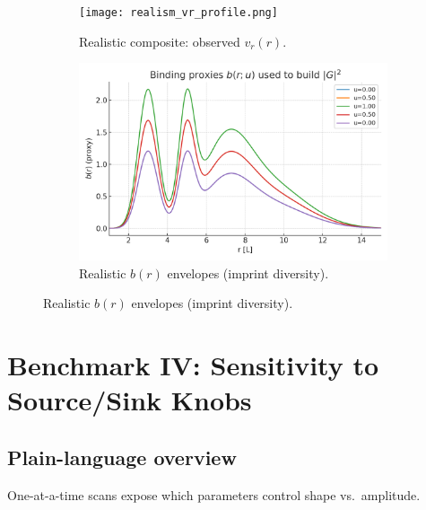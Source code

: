 \documentclass[12pt,a4paper,oneside]{scrreprt}
\begin{document}
\begin{figure}[htbp]\centering
  \begin{subfigure}[t]{0.49\linewidth}
    \texttt{[image: realism\_vr\_profile.png]}
    \caption{Realistic composite: observed $v_r(r)$.}
    \label{fig:real:vr}
  \end{subfigure}\hfill
  \begin{subfigure}[t]{0.49\linewidth}
    \includegraphics[width=\linewidth]{realism_b_profiles.png}
    \caption{Realistic $b(r)$ envelopes (imprint diversity).}
    \label{fig:real:b}
  \end{subfigure}
\end{figure}

\chapter{Benchmark IV: Sensitivity to Source/Sink Knobs}
\section*{Plain-language overview}
One-at-a-time scans expose which parameters control shape vs.\ amplitude.
\end{document}
